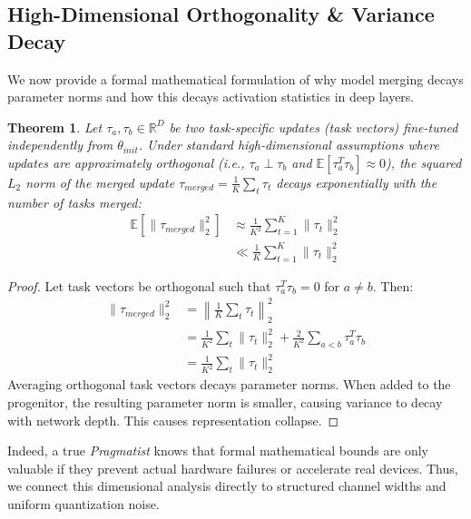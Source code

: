 \documentclass{article}
\theoremstyle{plain}
\newtheorem{theorem}{Theorem}[section]
\theoremstyle{definition}
\theoremstyle{remark}
\begin{document}
\subsection{High-Dimensional Orthogonality \& Variance Decay}
We now provide a formal mathematical formulation of why model merging decays parameter norms and how this decays activation statistics in deep layers.
\begin{theorem}
Let $\tau_a, \tau_b \in \mathbb{R}^D$ be two task-specific updates (task vectors) fine-tuned independently from $\theta_{init}$. Under standard high-dimensional assumptions where updates are approximately orthogonal (i.e., $\tau_a \perp \tau_b$ and $\mathbb{E}[\tau_a^T \tau_b] \approx 0$), the squared $L_2$ norm of the merged update $\tau_{merged} = \frac{1}{K} \sum_t \tau_t$ decays exponentially with the number of tasks merged:
\begin{equation}
\begin{aligned}
    \mathbb{E}[\|\tau_{merged}\|_2^2] &\approx \frac{1}{K^2} \sum_{t=1}^K \|\tau_t\|_2^2 \\
    &\ll \frac{1}{K} \sum_{t=1}^K \|\tau_t\|_2^2
\end{aligned}
\end{equation}
\end{theorem}
\begin{proof}
Let task vectors be orthogonal such that $\tau_a^T \tau_b = 0$ for $a \neq b$. Then:
\begin{equation}
\begin{aligned}
    \|\tau_{merged}\|_2^2 &= \left\| \frac{1}{K} \sum_t \tau_t \right\|_2^2 \\
    &= \frac{1}{K^2} \sum_t \|\tau_t\|_2^2 + \frac{2}{K^2} \sum_{a < b} \tau_a^T \tau_b \\
    &= \frac{1}{K^2} \sum_t \|\tau_t\|_2^2
\end{aligned}
\end{equation}
Averaging orthogonal task vectors decays parameter norms. When added to the progenitor, the resulting parameter norm is smaller, causing variance to decay with network depth. This causes representation collapse.
\end{proof}
Indeed, a true \textit{Pragmatist} knows that formal mathematical bounds are only valuable if they prevent actual hardware failures or accelerate real devices. Thus, we connect this dimensional analysis directly to structured channel widths and uniform quantization noise.
\end{document}

